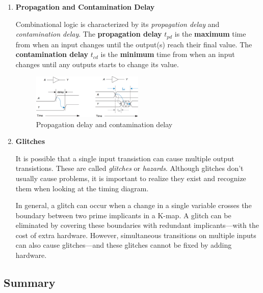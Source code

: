\documentclass[12pt]{article}
\begin{document}
\begin{enumerate}
    \item \textbf{Propagation and Contamination Delay}

    Combinational logic is characterized by its \textit{propagation delay} and \textit{contamination delay}. The \textbf{propagation delay} $t_{pd}$ is the \textbf{maximum} time from when an input changes until the output(s) reach their final value. The \textbf{contamination delay} $t_{cd}$ is the \textbf{minimum} time from when an input changes until any outputs starts to change its value.

    \begin{figure}[h]
        \centering
        \includegraphics[width=0.5\textwidth]{propagation_contamination_delay.png}
        \caption{Propagation delay and contamination delay}
        \label{figure:8}
    \end{figure}

    \item \textbf{Glitches}

    It is possible that a single input transistion can cause multiple output transistions. These are called \textit{glitches} or \textit{hazards}. Although glitches don't usually cause problems, it is important to realize they exist and recognize them when looking at the timing diagram.

    In general, a glitch can occur when a change in a single variable crosses the boundary between two prime implicants in a K-map. A glitch can be eliminated by covering these boundaries with redundant implicants---with the cost of extra hardware. However, simultaneous transitions on multiple inputs can also cause glitches---and these glitches cannot be fixed by adding hardware.
\end{enumerate}

\subsection{Summary}
\end{document}
